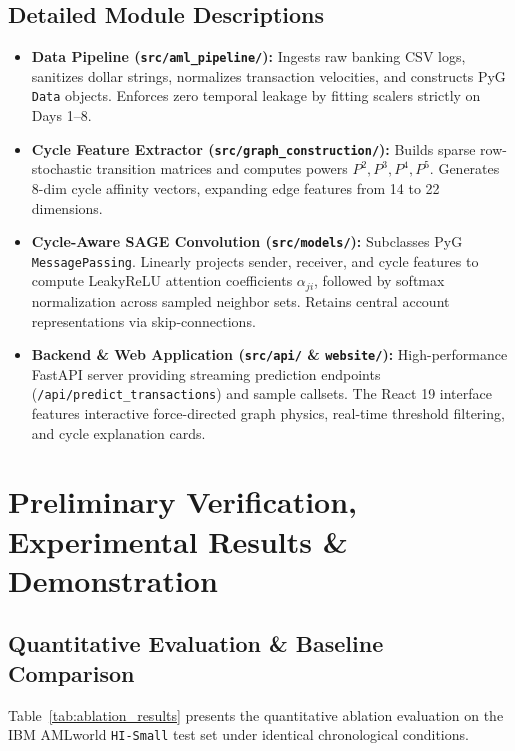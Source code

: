\documentclass[11pt, a4paper]{article}
\begin{document}
\subsection{Detailed Module Descriptions}
\begin{itemize}[noitemsep, topsep=2pt]
    \item \textbf{Data Pipeline (\texttt{src/aml\_pipeline/}):} Ingests raw banking CSV logs, sanitizes dollar strings, normalizes transaction velocities, and constructs PyG \texttt{Data} objects. Enforces zero temporal leakage by fitting scalers strictly on Days 1--8.
    \item \textbf{Cycle Feature Extractor (\texttt{src/graph\_construction/}):} Builds sparse row-stochastic transition matrices and computes powers $P^2, P^3, P^4, P^5$. Generates 8-dim cycle affinity vectors, expanding edge features from 14 to 22 dimensions.
    \item \textbf{Cycle-Aware SAGE Convolution (\texttt{src/models/}):} Subclasses PyG \texttt{MessagePassing}. Linearly projects sender, receiver, and cycle features to compute LeakyReLU attention coefficients $\alpha_{ji}$, followed by softmax normalization across sampled neighbor sets. Retains central account representations via skip-connections.
    \item \textbf{Backend \& Web Application (\texttt{src/api/} \& \texttt{website/}):} High-performance FastAPI server providing streaming prediction endpoints (\texttt{/api/predict\_transactions}) and sample callsets. The React 19 interface features interactive force-directed graph physics, real-time threshold filtering, and cycle explanation cards.
\end{itemize}

\section{Preliminary Verification, Experimental Results \& Demonstration}

\subsection{Quantitative Evaluation \& Baseline Comparison}
\noindent
Table~\ref{tab:ablation_results} presents the quantitative ablation evaluation on the IBM AMLworld \texttt{HI-Small} test set under identical chronological conditions.
\end{document}
